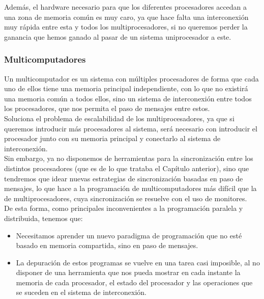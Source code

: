 Además, el hardware necesario para que los diferentes procesadores accedan a una zona de memoria común es muy caro, ya que hace falta una interconexión muy rápida entre esta y todos los multiprocesadores, si no queremos perder la ganancia que hemos ganado al pasar de un sistema uniprocesador a este.

\subsubsection{Multicomputadores}
Un multicomputador es un sistema con múltiples procesadores de forma que cada uno de ellos tiene una memoria principal independiente, con lo que no existirá una memoria común a todos ellos, sino un sistema de interconexión entre todos los procesadores, que nos permita el paso de mensajes entre estos.\\

Soluciona el problema de escalabilidad de los multiprocesadores, ya que si queremos introducir más procesadores al sistema, será necesario con introducir el procesador junto con su memoria principal y conectarlo al sistema de interconexión.\\

Sin embargo, ya no disponemos de herramientas para la sincronización entre los distintos procesadores (que es de lo que trataba el Capítulo anterior), sino que tendremos que idear nuevas estrategias de sincronización basadas en paso de mensajes, lo que hace a la programación de multicomputadores más difícil que la de multiprocesadores, cuya sincronización se resuelve con el uso de monitores.\\

\noindent
De esta forma, como principales inconvenientes a la programación paralela y distribuida, tenemos que:
\begin{itemize}
    \item Necesitamos aprender un nuevo paradigma de programación que no esté basado en memoria compartida, sino en paso de mensajes.
    \item La depuración de estos programas se vuelve en una tarea casi imposible, al no disponer de una herramienta que nos pueda mostrar en cada instante la memoria de cada procesador, el estado del procesador y las operaciones que se suceden en el sistema de interconexión.
\end{itemize}

